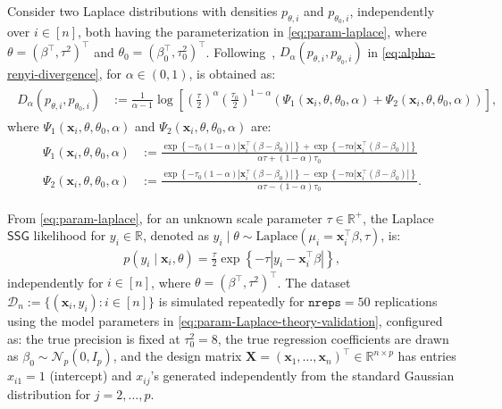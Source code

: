 \documentclass[12pt]{article}
\numberwithin{equation}{section}
\begin{document}
Consider two Laplace distributions with densities $p_{\theta, i}$ and $p_{\theta_0, i}$, independently over $i\in [n]$, both having the parameterization in \eqref{eq:param-laplace}, where $\theta = (\beta^{\top}, \tau^{2})^{\top}$ and $\theta_0 = (\beta_0^{\top}, \tau_0^{2})^{\top}$. Following~\cite{GIL2013124}, $D_{\alpha}(p_{\theta, i}, p_{\theta_0, i})$ in \eqref{eq:alpha-renyi-divergence}, for $\alpha \in (0,1)$, is obtained as:
\begin{align}\label{eq:alpha-renyi-divergence-single}
    \begin{split}
        D_{\alpha}(p_{\theta, i}, p_{\theta_0, i}) &:= \frac{1}{\alpha-1}\log \left[\left(\frac{\tau}{2}\right)^{\alpha}\left(\frac{\tau_0}{2}\right)^{1-\alpha}\left(\Psi_1(\mathbf{x}_i, \theta, \theta_0, \alpha) + \Psi_2(\mathbf{x}_i, \theta, \theta_0, \alpha)\right)\right],
    \end{split}
\end{align}
where $\Psi_1(\mathbf{x}_i, \theta, \theta_0, \alpha)$ and $\Psi_2(\mathbf{x}_i, \theta, \theta_0, \alpha)$ are:
\begin{align}\label{eq:alpha-renyi-divergence-single-components}
    \begin{split}
        \Psi_1(\mathbf{x}_i, \theta, \theta_0, \alpha) &:= \frac{\exp\left\{-\tau_0(1-\alpha)|\mathbf{x}_i^{\top}(\beta-\beta_0)|\right\} + \exp\left\{-\tau\alpha |\mathbf{x}_i^{\top}(\beta-\beta_0)|\right\}}{\alpha \tau + (1-\alpha)\tau_0}\\
        \Psi_2(\mathbf{x}_i, \theta, \theta_0, \alpha) &:= \frac{\exp\left\{-\tau_0(1-\alpha)|\mathbf{x}_i^{\top}(\beta-\beta_0)|\right\} - \exp\left\{-\tau\alpha |\mathbf{x}_i^{\top}(\beta-\beta_0)|\right\}}{\alpha \tau - (1-\alpha)\tau_0}.
    \end{split}
\end{align}

From \eqref{eq:param-laplace}, for an unknown scale parameter $\tau \in \mathbb{R}^{+}$, the Laplace $\mathsf{SSG}$ likelihood for $y_i\in \mathbb{R}$, denoted as $y_i\mid \theta \sim \mathrm{Laplace}(\mu_i = \mathbf{x}_i^{\top}\beta, \tau)$, is:
\begin{align}\label{eq:param-Laplace-theory-validation}
    p(y_i\mid \mathbf{x}_i, \theta) = \tfrac{\tau}{2}\exp\left\{-\tau|y_i - \mathbf{x}_i^{\top}\beta|\right\},
\end{align}
independently for $i\in [n]$, where $\theta = (\beta^{\top}, \tau^{2})^{\top}$. The dataset $\mathcal{D}_n := \{(\mathbf{x}_i, y_i): i\in [n]\}$ is simulated repeatedly for $\texttt{nreps}=50$ replications using the model parameters in \eqref{eq:param-Laplace-theory-validation}, configured as: the true precision is fixed at $\tau_0^2 = 8$, the true regression coefficients are drawn as $\beta_0 \sim \mathcal{N}_{p}(0, I_{p})$, and the design matrix $\mathbf{X} = (\mathbf{x}_1, \ldots, \mathbf{x}_n)^{\top} \in \mathbb{R}^{n\times p}$ has entries $x_{i1}=1$ (intercept) and $x_{ij}$'s generated independently from the standard Gaussian distribution for $j=2, \ldots, p$.
\end{document}

